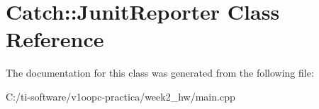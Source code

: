 \hypertarget{class_catch_1_1_junit_reporter}{}\section{Catch\+:\+:Junit\+Reporter Class Reference}
\label{class_catch_1_1_junit_reporter}


The documentation for this class was generated from the following file\+:\begin{DoxyCompactItemize}
\item 
C\+:/ti-\/software/v1oopc-\/practica/week2\+\_\+hw/main.\+cpp\end{DoxyCompactItemize}
